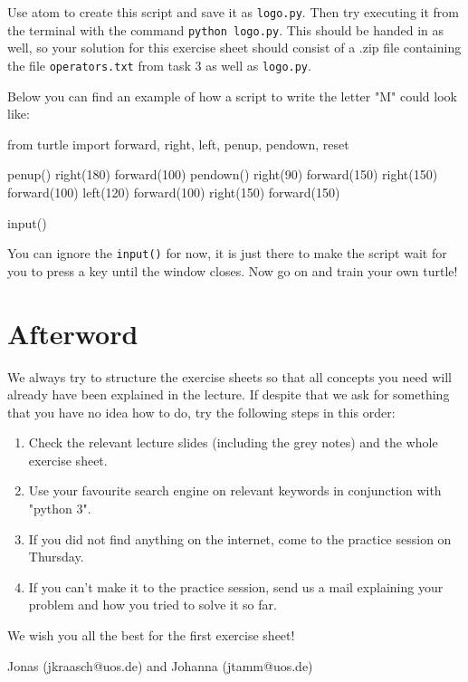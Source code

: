 \vspace{1em}

\noindent Use atom to create this script and save it as \texttt{logo.py}. Then try executing it from the terminal with the command \texttt{python logo.py}. This should be handed in as well, so your solution for this exercise sheet should consist of a .zip file containing the file \texttt{operators.txt} from task 3 as well as \texttt{logo.py}.

\noindent Below you can find an example of how a script to write the letter "M" could look like:

\begin{pythoncode}

from turtle import forward, right, left, penup, pendown, reset

penup()
right(180)
forward(100)
pendown()
right(90)
forward(150)
right(150)
forward(100)
left(120)
forward(100)
right(150)
forward(150)

input()

\end{pythoncode}

\noindent You can ignore the \texttt{input()} for now, it is just there to make the script wait for you to press a key until the window closes. Now go on and train your own turtle!

\newpage

\section*{Afterword}

\noindent We always try to structure the exercise sheets so that all concepts you need will already have been explained in the lecture. If despite that we ask for something that you have no idea how to do, try the following steps in this order:

\begin{enumerate}

\item Check the relevant lecture slides (including the grey notes) and the whole exercise sheet.
\item Use your favourite search engine on relevant keywords in conjunction with "python 3".
\item If you did not find anything on the internet, come to the practice session on Thursday.
\item If you can't make it to the practice session, send us a mail explaining your problem and how you tried to solve it so far.

\end{enumerate}

\vspace{1em}

\noindent We wish you all the best for the first exercise sheet!

\vspace{1em}

\noindent Jonas (jkraasch@uos.de) and Johanna (jtamm@uos.de)




